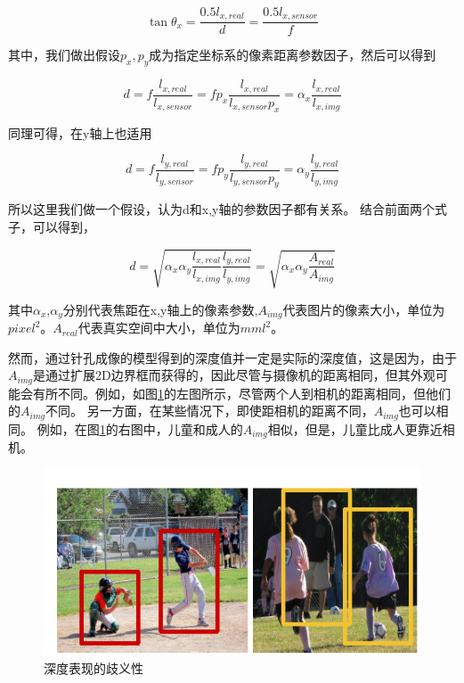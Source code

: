\begin{equation}
\tan {\theta _x} = \frac{{0.5{l_{x,real}}}}{d} = \frac{{0.5{l_{x,sensor}}}}{f}
\end{equation}

其中，我们做出假设$p_x,p_y$成为指定坐标系的像素距离参数因子，然后可以得到

\begin{equation}
d = f\frac{{{l_{x,real}}}}{{{l_{x,sensor}}}} = f{p_x}\frac{{{l_{x,real}}}}{{{l_{x,sensor}}{p_x}}} = {\alpha _x}\frac{{{l_{x,real}}}}{{{l_{x,img}}}}
\end{equation}

同理可得，在y轴上也适用

\begin{equation}
d = f\frac{{{l_{y,real}}}}{{{l_{y,sensor}}}} = f{p_y}\frac{{{l_{y,real}}}}{{{l_{y,sensor}}{p_y}}} = {\alpha _y}\frac{{{l_{y,real}}}}{{{l_{y,img}}}}
\end{equation}

所以这里我们做一个假设，认为d和x,y轴的参数因子都有关系。
结合前面两个式子，可以得到，

\begin{equation}
d = \sqrt {{\alpha _x}{\alpha _y}\frac{{{l_{x,real}}}}{{{l_{x,img}}}}\frac{{{l_{y,real}}}}{{{l_{y,img}}}}}  = \sqrt {{\alpha _x}{\alpha _y}\frac{{{A_{real}}}}{{{A_{img}}}}} 
\end{equation}

其中${\alpha _x}$,${\alpha _y}$分别代表焦距在x,y轴上的像素参数,${A_{img}}$代表图片的像素大小，单位为
$pixe{l^2}$。${A_{real}}$代表真实空间中大小，单位为$mm{l^2}$。

然而，通过针孔成像的模型得到的深度值并一定是实际的深度值，这是因为，由于${A_{img}}$是通过扩展2D边界框而获得的，因此尽管与摄像机的距离相同，但其外观可能会有所不同。例如，如图\ref{depth_ambiguity}的左图所示，尽管两个人到相机的距离相同，但他们的${A_{img}}$不同。 另一方面，在某些情况下，即使距相机的距离不同，${A_{img}}$也可以相同。 例如，在图\ref{depth_ambiguity}的右图中，儿童和成人的${A_{img}}$相似，但是，儿童比成人更靠近相机。

\begin{figure}[h]
	\includegraphics{pic/depth_ambiguity.png}
	\caption{深度表现的歧义性}
	\label{depth_ambiguity}
\end{figure}

